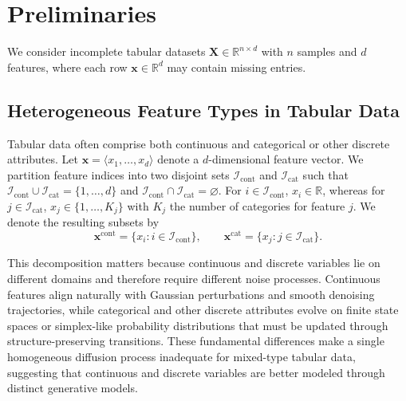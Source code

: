 \documentclass[times, review, 10pt]{elsarticle}
\begin{document}
\section{Preliminaries}

We consider incomplete tabular datasets $\mathbf{X} \in \mathbb{R}^{n \times d}$ with $n$ samples and $d$ features, where each row $\mathbf{x} \in \mathbb{R}^d$ may contain missing entries.



\subsection{Heterogeneous Feature Types in Tabular Data}

Tabular data often comprise both continuous and categorical or other discrete attributes. Let $\mathbf{x} = \langle x_1, \ldots, x_d \rangle$ denote a $d$-dimensional feature vector. We partition feature indices into two disjoint sets $\mathcal{I}_{\mathrm{cont}}$ and $\mathcal{I}_{\mathrm{cat}}$ such that $\mathcal{I}_{\mathrm{cont}} \cup \mathcal{I}_{\mathrm{cat}} = \{1,\ldots,d\}$ and $\mathcal{I}_{\mathrm{cont}} \cap \mathcal{I}_{\mathrm{cat}} = \varnothing$. For $i \in \mathcal{I}_{\mathrm{cont}}$, $x_i \in \mathbb{R}$, whereas for $j \in \mathcal{I}_{\mathrm{cat}}$, $x_j \in \{1, \ldots, K_j\}$ with $K_j$ the number of categories for feature $j$. We denote the resulting subsets by
\[
\mathbf{x}^{\mathrm{cont}} = \{x_i : i \in \mathcal{I}_{\mathrm{cont}}\},
\qquad
\mathbf{x}^{\mathrm{cat}} = \{x_j : j \in \mathcal{I}_{\mathrm{cat}}\}.
\]

This decomposition matters because continuous and discrete variables lie on
different domains and therefore require different noise processes.
Continuous features align naturally with Gaussian perturbations and smooth
denoising trajectories, while categorical and other discrete attributes
evolve on finite state spaces or simplex-like probability distributions that
must be updated through structure-preserving transitions. These fundamental
differences make a single homogeneous diffusion process inadequate for
mixed-type tabular data, suggesting that continuous and discrete variables
are better modeled through distinct generative models.
\end{document}
